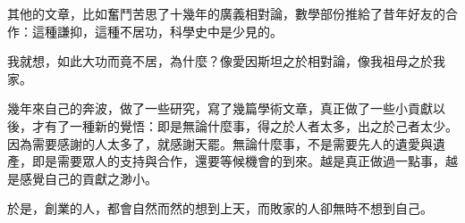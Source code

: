\begin{acknowledgement}
其他的文章，比如奮鬥苦思了十幾年的廣義相對論，數學部份推給了昔年好友的合作：這種謙抑，這種不居功，科學史中是少見的。

我就想，如此大功而竟不居，為什麼？像愛因斯坦之於相對論，像我祖母之於我家。

幾年來自己的奔波，做了一些研究，寫了幾篇學術文章，真正做了一些小貢獻以後，才有了一種新的覺悟：即是無論什麼事，得之於人者太多，出之於己者太少。因為需要感謝的人太多了，就感謝天罷。無論什麼事，不是需要先人的遺愛與遺產，即是需要眾人的支持與合作，還要等候機會的到來。越是真正做過一點事，越是感覺自己的貢獻之渺小。

於是，創業的人，都會自然而然的想到上天，而敗家的人卻無時不想到自己。

\end{acknowledgement}